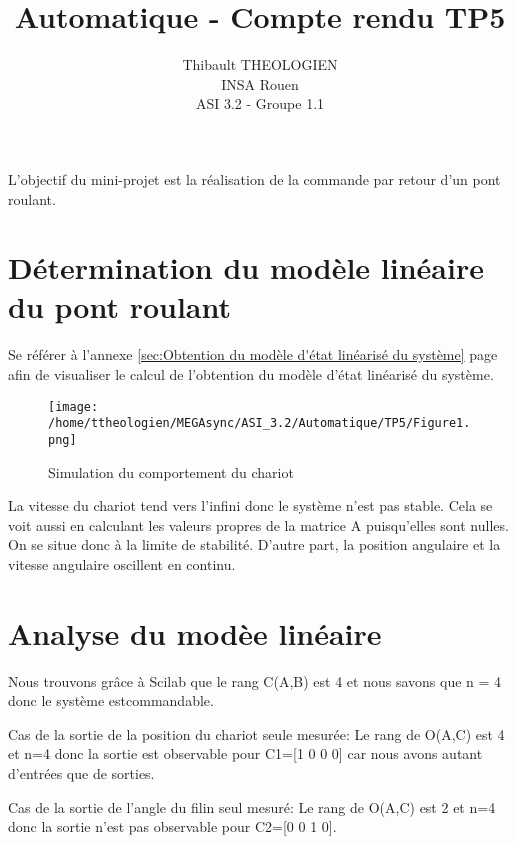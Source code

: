 \documentclass[a4paper,12pt]{article}
\title{Automatique - Compte rendu TP5}
\author{
	Thibault THEOLOGIEN\\
	INSA Rouen\\
	ASI 3.2 - Groupe 1.1
}
\begin{document}
	\maketitle
	\tableofcontents
	\newpage

  \par L'objectif du mini-projet est la réalisation de la commande par retour d'un pont roulant.

  \section{Détermination du modèle linéaire du pont roulant}
  \label{sec:Détermination du modèle linéaire du pont roulant}
    \par Se référer à l'annexe \ref{sec:Obtention du modèle d'état linéarisé du système} page \pageref{sec:Obtention du modèle d'état linéarisé du système}
    afin de visualiser le calcul de l'obtention du modèle d'état linéarisé du système.

    \begin{figure}[h]
      \caption{Simulation du comportement du chariot}
      \centering
      \texttt{[image: /home/ttheologien/MEGAsync/ASI\_3.2/Automatique/TP5/Figure1.png]}
    \end{figure}

    \par La vitesse du chariot tend vers l'infini donc le système n'est pas stable.
    Cela se voit aussi en calculant les valeurs propres de la matrice A puisqu'elles sont nulles.
    On se situe donc à la limite de stabilité.
    D'autre part, la position angulaire et la vitesse angulaire oscillent en continu.
  \newpage

  \section{Analyse du modèe linéaire}
  \label{sec:Analyse du modèe linéaire}
    \par Nous trouvons grâce à Scilab que le rang C(A,B) est 4 et nous savons que n = 4 donc le système estcommandable.\\

    \par Cas de la sortie de la position du chariot seule mesurée:
    Le rang de O(A,C) est 4 et n=4 donc la sortie est observable pour C1=[1 0 0 0] car nous avons autant d'entrées que de sorties.\\

    \par Cas de la sortie de l'angle du filin seul mesuré:
    Le rang de O(A,C) est 2 et n=4 donc la sortie n'est pas observable pour C2=[0 0 1 0].\\
\end{document}
